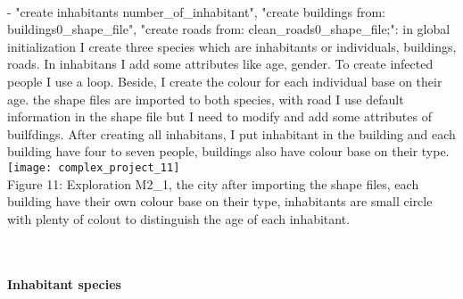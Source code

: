 \documentclass{article}
\begin{document}
\\- "create inhabitants number\_of\_inhabitant", "create buildings from: buildings0\_shape\_file", "create roads from: clean\_roads0\_shape\_file;": in global initialization I create three species which are inhabitants or individuals, buildings, roads. In inhabitans I add some attributes like age, gender. To create infected people I use a loop. Beside, I create the colour for each individual base on their age. the shape files are imported to both species, with road I use default information in the shape file but I need to modify and add some attributes of builfdings. After creating all inhabitans, I put inhabitant in the building and each building have four to seven people, buildings also have colour base on their type.
\\
\texttt{[image: complex\_project\_11]}
\\
\caption{Figure 11: Exploration M2\_1, the city after importing the shape files, each building have their own colour base on their type, inhabitants are small circle with plenty of colout to distinguish the age of each inhabitant.} 
\\\\
\large{\textbf{Inhabitant species}}
\end{document}
